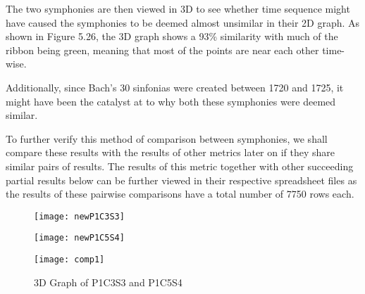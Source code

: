 The two symphonies are then viewed in 3D to see whether time sequence might have caused the symphonies to be deemed almost unsimilar in their 2D graph. As shown in Figure 5.26, the 3D graph shows a 93\% similarity with much of the ribbon being green, meaning that most of the points are near each other time-wise.

Additionally, since Bach's 30 sinfonias were created between 1720 and 1725, it might have been the catalyst at to why both these symphonies were deemed similar.

To further verify this method of comparison between symphonies, we shall compare these results with the results of other metrics later on if they share similar pairs of results. The results of this metric together with other succeeding partial results below can be further viewed in their respective spreadsheet files as the results of these pairwise comparisons have a total number of 7750 rows each.

\begin{figure}[H]
\begin{minipage}{.5\textwidth}
  \centering
  \texttt{[image: newP1C3S3]}
  \label{fig:test1}
\end{minipage}
\begin{minipage}{.5\textwidth}
  \centering
  \texttt{[image: newP1C5S4]}
  \label{fig:test2}
\end{minipage}
\end{figure}

\begin{figure}[H]
\caption{3D Graph of P1C3S3 and P1C5S4}
\centering
\texttt{[image: comp1]}
\end{figure}

